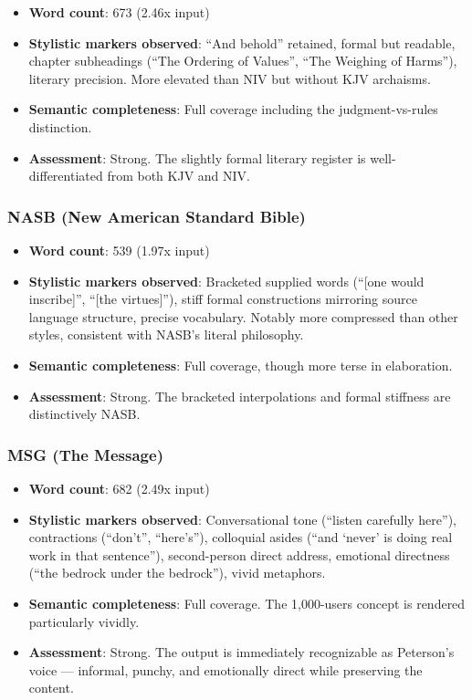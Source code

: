 \documentclass[10pt, letterpaper, twocolumn]{article}
\providecommand{\tightlist}{\setlength{\itemsep}{0pt}\setlength{\parskip}{0pt}}
\begin{document}
\begin{itemize}
\tightlist
\item
  \textbf{Word count}: 673 (2.46x input)
\item
  \textbf{Stylistic markers observed}: ``And behold'' retained, formal but readable, chapter subheadings (``The Ordering of Values'', ``The Weighing of Harms''), literary precision. More elevated than NIV but without KJV archaisms.
\item
  \textbf{Semantic completeness}: Full coverage including the judgment-vs-rules distinction.
\item
  \textbf{Assessment}: Strong. The slightly formal literary register is well-differentiated from both KJV and NIV.
\end{itemize}

\subsubsection*{NASB (New American Standard Bible)}\label{nasb-new-american-standard-bible}

\begin{itemize}
\tightlist
\item
  \textbf{Word count}: 539 (1.97x input)
\item
  \textbf{Stylistic markers observed}: Bracketed supplied words (``{[}one would inscribe{]}'', ``{[}the virtues{]}''), stiff formal constructions mirroring source language structure, precise vocabulary. Notably more compressed than other styles, consistent with NASB's literal philosophy.
\item
  \textbf{Semantic completeness}: Full coverage, though more terse in elaboration.
\item
  \textbf{Assessment}: Strong. The bracketed interpolations and formal stiffness are distinctively NASB.
\end{itemize}

\subsubsection*{MSG (The Message)}\label{msg-the-message}

\begin{itemize}
\tightlist
\item
  \textbf{Word count}: 682 (2.49x input)
\item
  \textbf{Stylistic markers observed}: Conversational tone (``listen carefully here''), contractions (``don't'', ``here's''), colloquial asides (``and `never' is doing real work in that sentence''), second-person direct address, emotional directness (``the bedrock under the bedrock''), vivid metaphors.
\item
  \textbf{Semantic completeness}: Full coverage. The 1,000-users concept is rendered particularly vividly.
\item
  \textbf{Assessment}: Strong. The output is immediately recognizable as Peterson's voice --- informal, punchy, and emotionally direct while preserving the content.
\end{itemize}
\end{document}
